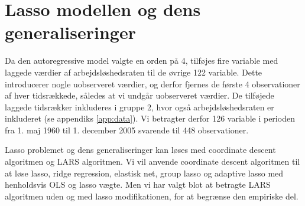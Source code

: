 \chapter{Lasso modellen og dens generaliseringer}
Da den autoregressive model valgte en orden på 4, tilføjes fire variable med laggede værdier af arbejdsløshedsraten til de øvrige 122 variable.
Dette introducerer nogle uobserveret værdier, og derfor fjernes de første 4 observationer af hver tidsrækkede, således at vi undgår uobserveret værdier.
De tilføjede laggede tidsrækker inkluderes i gruppe 2, hvor også arbejdsløshedsraten er inkluderet (se appendiks \ref{app:data}).
Vi betragter derfor 126 variable i perioden fra 1. maj 1960 til 1. december 2005 svarende til 448 observationer.

Lasso problemet og dens generaliseringer kan løses med coordinate descent algoritmen og LARS algoritmen.
Vi vil anvende coordinate descent algoritmen til at løse lasso, ridge regression, elastisk net, group lasso og adaptive lasso med henholdsvis OLS og lasso vægte.
Men vi har valgt blot at betragte LARS algoritmen uden og med lasso modifikationen, for at begrænse den empiriske del.





%
